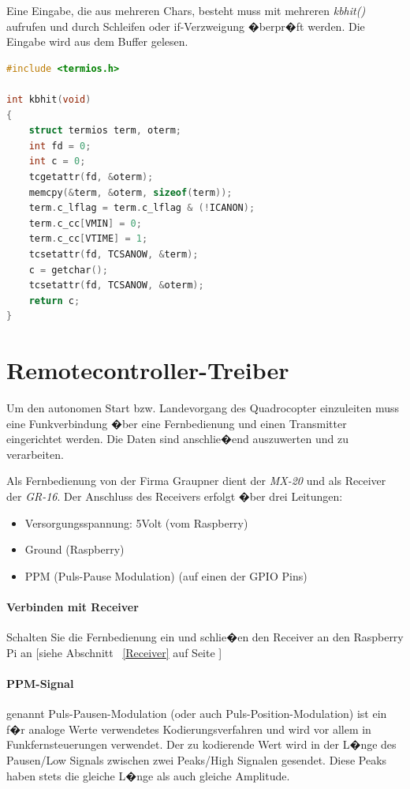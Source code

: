 Eine Eingabe, die aus mehreren Chars, besteht muss mit mehreren \emph{kbhit()} aufrufen und durch Schleifen oder if-Verzweigung �berpr�ft werden. Die Eingabe wird aus dem Buffer gelesen.


\begin{lstlisting}[language=C++,firstnumber=0]
#include <termios.h>

int kbhit(void)
{
	struct termios term, oterm;
	int fd = 0;
	int c = 0;
	tcgetattr(fd, &oterm);
	memcpy(&term, &oterm, sizeof(term));
	term.c_lflag = term.c_lflag & (!ICANON);
	term.c_cc[VMIN] = 0;
	term.c_cc[VTIME] = 1;
	tcsetattr(fd, TCSANOW, &term);
	c = getchar();
	tcsetattr(fd, TCSANOW, &oterm);
	return c; 
}
\end{lstlisting}
\newpage
\section{Remotecontroller-Treiber}
\label{Controller Treiber}

Um den autonomen Start bzw. Landevorgang des Quadrocopter einzuleiten muss eine Funkverbindung �ber eine Fernbedienung und einen Transmitter eingerichtet werden. Die Daten sind anschlie�end auszuwerten und zu verarbeiten.

Als Fernbedienung von der Firma Graupner dient der \emph{MX-20} und als Receiver der \emph{GR-16}. Der Anschluss des Receivers erfolgt �ber drei Leitungen:
\begin{itemize} 
	\item  Versorgungsspannung:  5Volt (vom Raspberry) 
	\item  Ground (Raspberry)
	\item PPM (Puls-Pause Modulation) (auf einen der GPIO Pins)
\end{itemize}


\paragraph{Verbinden mit Receiver}
Schalten Sie die Fernbedienung ein und schlie�en den Receiver an den Raspberry Pi an [siehe Abschnitt~ \ref{Receiver} auf Seite \pageref{Receiver}]

\paragraph{PPM-Signal} genannt Puls-Pausen-Modulation (oder auch Puls-Position-Modulation) ist ein f�r analoge Werte verwendetes Kodierungsverfahren und wird vor allem in Funkfernsteuerungen verwendet. Der zu kodierende Wert wird in der L�nge des Pausen/Low Signals zwischen zwei Peaks/High Signalen gesendet. Diese Peaks haben stets die gleiche L�nge als auch gleiche Amplitude.\cite{doc:ppm}

